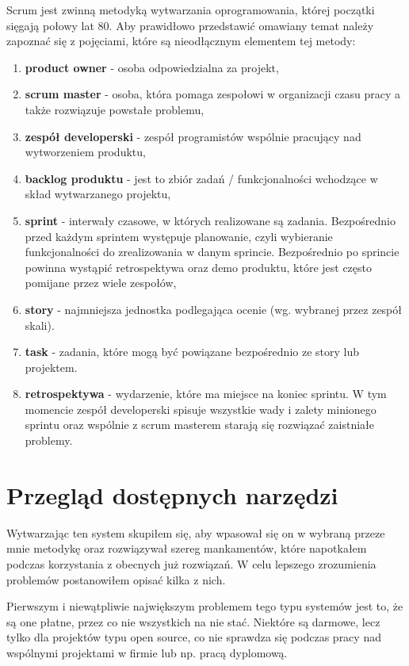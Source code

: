 Scrum jest zwinną metodyką wytwarzania oprogramowania, której początki sięgają połowy lat 80. Aby prawidłowo przedstawić omawiany temat należy zapoznać się z pojęciami, które są nieodłącznym elementem tej metody:
\begin{enumerate}
	\item \textbf{product owner} - osoba odpowiedzialna za projekt,
	\item \textbf{scrum master} - osoba, która pomaga zespołowi w organizacji czasu pracy a także rozwiązuje powstałe problemu,
	\item \textbf{zespół developerski} - zespół programistów wspólnie pracujący nad wytworzeniem produktu,
	\item \textbf{backlog produktu} - jest to zbiór zadań / funkcjonalności wchodzące w skład wytwarzanego projektu,
	\item \textbf{sprint} - interwały czasowe, w których realizowane są zadania. Bezpośrednio przed każdym sprintem występuje planowanie, czyli wybieranie funkcjonalności do zrealizowania w danym sprincie. Bezpośrednio po sprincie powinna wystąpić retrospektywa oraz demo produktu, które jest często pomijane przez wiele zespołów,
	\item \textbf{story} - najmniejsza jednostka podlegająca ocenie (wg. wybranej przez zespół skali). 
	\item \textbf{task} - zadania, które mogą być powiązane bezpośrednio ze story lub projektem.
	\item \textbf{retrospektywa} - wydarzenie, które ma miejsce na koniec sprintu. W tym momencie zespół developerski spisuje wszystkie wady i zalety minionego sprintu oraz wspólnie z scrum masterem starają się rozwiązać zaistniałe problemy.
\end{enumerate} 

\section{Przegląd dostępnych narzędzi}
Wytwarzając ten system skupiłem się, aby wpasował się on w wybraną przeze mnie metodykę oraz rozwiązywał szereg mankamentów, które napotkałem podczas korzystania z obecnych już rozwiązań. W celu lepszego zrozumienia problemów postanowiłem opisać kilka z nich.

Pierwszym i niewątpliwie największym problemem tego typu systemów jest to, że są one płatne, przez co nie wszystkich na nie stać. Niektóre są darmowe, lecz tylko dla projektów typu open source, co nie sprawdza się podczas pracy nad wspólnymi projektami w firmie lub np. pracą dyplomową.


